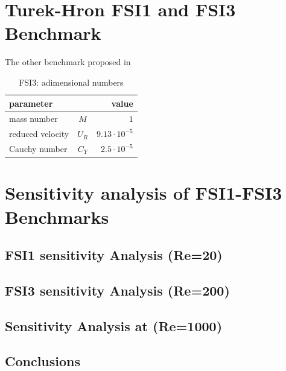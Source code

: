 \section{Turek-Hron FSI1 and FSI3 Benchmark}
\label{sec:FSI1-FSI3}

The other benchmark proposed in \cite{turek2006proposal}



\begin{table}[!h]
	\begin{center}
		\begin{tabular}{ l c | r } 
			parameter & & value   \\ 
			\hline
			mass number  & $M$ & $1$     \\
			reduced velocity & $U_R$ & $9.13\cdot 10^{-5}$  \\
			Cauchy number  & $C_Y$ & $2.5\cdot 10^{-5}$  \\			
		\end{tabular}
	\end{center}
	\caption{FSI3: adimensional numbers}
	\label{fsi3:ex1-adim}
\end{table}























\section{Sensitivity analysis of FSI1-FSI3 Benchmarks}
\label{sec:FSI3-sensitivity}

\subsection{FSI1 sensitivity Analysis (Re=20)}


\subsection{FSI3 sensitivity Analysis (Re=200)}


\subsection{Sensitivity Analysis at (Re=1000)}

\subsection{Conclusions}
